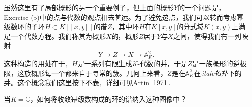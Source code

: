 虽然这里有了局部概形的另一个重要例子，但上面的概形$Y$的一个问题是，Exercise {\theexe}(b)中的点与代数的观点相去甚远。为了避免这点，我们可以转而考虑幂级数环的子环$H\subset K[\![x,y]\!]$的谱$Z$，其中环$H$在$K[x,y]$的分式域$K(x,y)$上满足一个代数方程。我们称其为概形$X$的，概形$Z$居于$Y$与$X$之间，使得我们有一列映射
\[
	Y\to Z\to X\to \mathbb{A}_K^2.
\]
这种构造的用处在于，$H$是一系列有限生成$K$\hyp 代数的并，于是$Z$是一族概形的逆极限，这族概形每一个都来自于寻常的簇。几何上来看，$Z$是在$\mathbb{A}_K^2$在\textit{\'{e}tale拓扑}下的芽。这个概念我们这里按下不表，详细可见Artin [1971].

\begin{exe}
	当$K=\mathbb{C}$，如何将收敛幂级数构成的环的谱纳入这种图像中？
\end{exe}